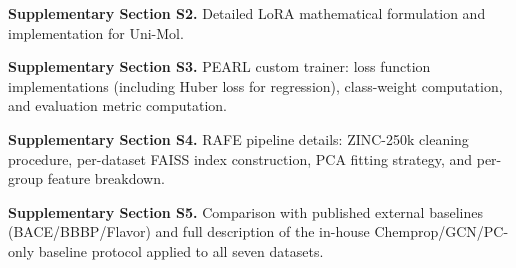 \documentclass[final,1p,times]{elsarticle}
\begin{document}
\noindent\textbf{Supplementary Section S2.} Detailed LoRA mathematical formulation and implementation for Uni-Mol.

\noindent\textbf{Supplementary Section S3.} PEARL custom trainer: loss function implementations (including Huber loss for regression), class-weight computation, and evaluation metric computation.

\noindent\textbf{Supplementary Section S4.} RAFE pipeline details: ZINC-250k cleaning procedure, per-dataset FAISS index construction, PCA fitting strategy, and per-group feature breakdown.

\noindent\textbf{Supplementary Section S5.} Comparison with published external baselines (BACE/BBBP/Flavor) and full description of the in-house Chemprop/GCN/PC-only baseline protocol applied to all seven datasets.

 

\end{document}
